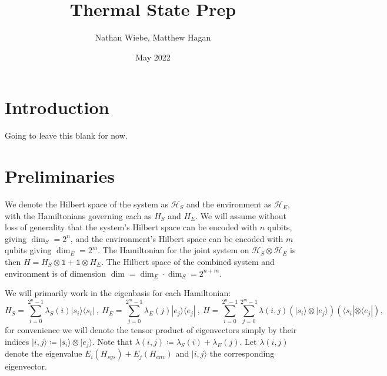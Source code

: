 \documentclass{article}
\title{Thermal State Prep}
\author{Nathan Wiebe, Matthew Hagan}
\date{May 2022}
\newcommand{\ket}[1]{|#1\rangle}
\newcommand{\bra}[1]{\langle #1|}
\newcommand{\ketbra}[2]{| #1\rangle\! \langle #2|}
\newcommand{\hilb}{\mathcal{H}}
\newcommand{\identity}{\mathds{1}}
\begin{document}
\maketitle

\section{Introduction}
Going to leave this blank for now. \cite{shiraishi_undecidability_2021}

\section{Preliminaries}
We denote the Hilbert space of the system as $\hilb_{S}$ and the environment as $\hilb_{E}$, with the Hamiltonians governing each as $H_{S}$ and $H_{E}$. We will assume without loss of generality that the system's Hilbert space can be encoded with $n$ qubits, giving $\dim_S = 2^{n}$, and the environment's Hilbert space can be encoded with $m$ qubits giving $\dim_E = 2^{m}$. The Hamiltonian for the joint system on $\hilb_{S} \otimes \hilb_{E}$ is then $H = H_{S} \otimes \identity + \identity \otimes H_{E}$. The Hilbert space of the combined system and environment is of dimension $\dim = \dim_E \cdot \dim_S = 2^{n + m}$. 

We will primarily work in the eigenbasis for each Hamiltonian:
\begin{equation}
    H_{S} = \sum_{i = 0}^{2^n - 1} \lambda_S(i) \ketbra{s_i}{s_i} ~,~ H_{E} = \sum_{j=0}^{2^m - 1} \lambda_E(j) \ketbra{e_j}{e_j} ~,~ H = \sum_{i=0}^{2^n - 1} \sum_{j=0}^{2^m - 1} \lambda(i,j) (\ket{s_i} \otimes \ket{e_j})(\bra{s_i} \otimes \bra{e_j}),
\end{equation}
for convenience we will denote the tensor product of eigenvectors simply by their indices $\ket{i,j} \coloneqq \ket{s_i} \otimes \ket{e_j}$. Note that $\lambda(i,j) \coloneqq \lambda_S(i) + \lambda_E(j)$. 
Let $\lambda(i,j)$ denote the eigenvalue $E_i(H_{sys}) + E_j(H_{env})$ and $\ket{i,j}$ the corresponding eigenvector. 
\end{document}
